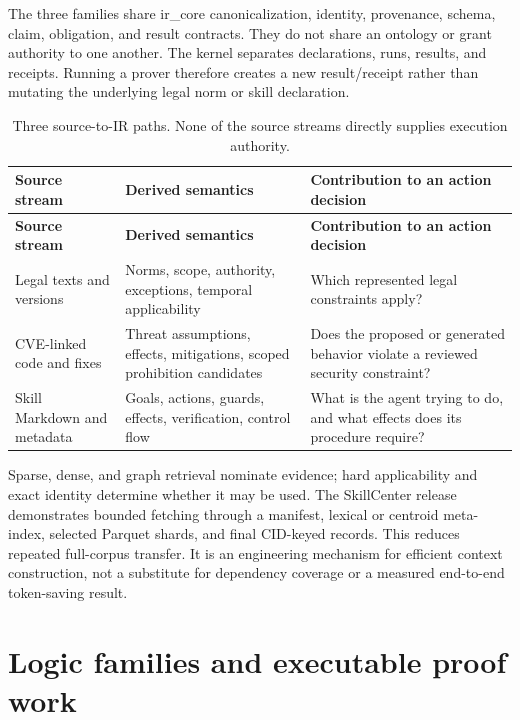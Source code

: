\documentclass{article}
\begin{document}
The three families share ir\_\allowbreak{}core canonicalization, identity, provenance, schema, claim, obligation, and result contracts. They do not share an ontology or grant authority to one another. The kernel separates declarations, runs, results, and receipts. Running a prover therefore creates a new result/receipt rather than mutating the underlying legal norm or skill declaration.
\begingroup
\renewcommand{\thetable}{1}
\begin{longtable}{@{}>{\raggedright\arraybackslash}p{.24\linewidth} >{\raggedright\arraybackslash}p{.32\linewidth} >{\raggedright\arraybackslash}p{.38\linewidth}@{}}
\caption{Three source-to-IR paths. None of the source streams directly supplies execution authority.}\label{tab:1}\\
\toprule
\textbf{Source stream} & \textbf{Derived semantics} & \textbf{Contribution to an action decision} \\
\midrule
\endfirsthead
\textbf{Source stream} & \textbf{Derived semantics} & \textbf{Contribution to an action decision} \\
\midrule
\endhead
\bottomrule
\endlastfoot
Legal texts and versions & Norms, scope, authority, exceptions, temporal applicability & Which represented legal constraints apply? \\[3pt]
CVE-linked code and fixes & Threat assumptions, effects, mitigations, scoped prohibition candidates & Does the proposed or generated behavior violate a reviewed security constraint? \\[3pt]
Skill Markdown and metadata & Goals, actions, guards, effects, verification, control flow & What is the agent trying to do, and what effects does its procedure require? \\[3pt]
\end{longtable}
\endgroup


Sparse, dense, and graph retrieval nominate evidence; hard applicability and exact identity determine whether it may be used. The SkillCenter release demonstrates bounded fetching through a manifest, lexical or centroid meta-index, selected Parquet shards, and final CID-keyed records. This reduces repeated full-corpus transfer. It is an engineering mechanism for efficient context construction, not a substitute for dependency coverage or a measured end-to-end token-saving result.

\section{Logic families and executable proof work}
\end{document}
